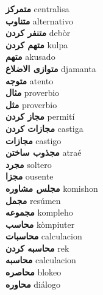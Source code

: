 \textbf{ متمرکز  } centralisa \\
\textbf{ متناوب  } alternativo \\
\textbf{ متنفر کردن  } debòr \\
\textbf{ متهم کردن  } kulpa \\
\textbf{ متهم  } akusado \\
\textbf{ متوازی الاضلاع  } djamanta \\
\textbf{ متوجه  } atento \\
\textbf{ مثال  } proverbio \\
\textbf{ مثل  } proverbio \\
\textbf{ مجاز کردن  } permití \\
\textbf{ مجازات کردن  } castiga \\
\textbf{ مجازات  } castigo \\
\textbf{ مجذوب ساختن  } atraé \\
\textbf{ مجرد  } soltero \\
\textbf{ مجزا  } ousente \\
\textbf{ مجلس مشاوره  } komishon \\
\textbf{ مجمل  } resúmen \\
\textbf{ مجموعه  } kompleho \\
\textbf{ محاسب  } kòmpiuter \\
\textbf{ محاسبات  } calculacion \\
\textbf{ محاسبه کردن  } rek \\
\textbf{ محاسبه  } calculacion \\
\textbf{ محاصره  } blokeo \\
\textbf{ محاوره  } diálogo \\
